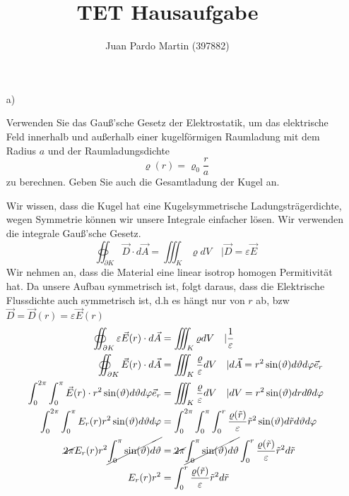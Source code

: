\documentclass{scrartcl}
\title{TET Hausaufgabe}
\author{Juan Pardo Martin (397882)}
\let\*\cdot
\begin{document}
\maketitle
\begin{itemize}
\item[a)] 
  
Verwenden Sie das Gauß’sche Gesetz der Elektrostatik, um das elektrische Feld innerhalb und außerhalb einer kugelförmigen Raumladung mit dem Radius $a$ und der Raumladungsdichte
\[\varrho(r)=\varrho_0 \frac{r}{a}\]
zu berechnen. Geben Sie auch die Gesamtladung der Kugel an.

Wir wissen, dass die Kugel hat eine Kugelsymmetrische Ladungsträgerdichte, wegen Symmetrie können wir unsere Integrale einfacher lösen.
Wir verwenden die integrale Gauß’sche Gesetz. 
\[\oiint_{\partial K} \vec{D} \* d \vec{A} = \iiint_{K} \varrho dV\quad | \vec{D}=\varepsilon \vec{E}\]
Wir nehmen an, dass die Material eine linear isotrop homogen Permitivität hat.
Da unsere Aufbau symmetrisch ist, folgt daraus, dass die Elektrische Flussdichte auch symmetrisch ist, d.h es hängt nur von $r$ ab, bzw $\vec{D}=\vec{D}(r)=\varepsilon \vec{E}(r)$
      \begin{align}
        \oiint_{\partial K} \varepsilon\vec{E}(r) \* d \vec{A} &= \iiint_{K} \varrho dV \quad| \frac{1}{\varepsilon} \nonumber\\
        \oiint_{\partial K} \vec{E}(r) \* d \vec{A} &= \iiint_{K} \frac{\varrho}{\varepsilon} dV \quad| d \vec{A} = r^2 \sin(\vartheta) d\vartheta d\varphi \vec{e}_r \nonumber\\
\int_0^{2\pi} \int_0^\pi \vec{E}(r) \* r^2 \sin(\vartheta) d\vartheta d\varphi \vec{e}_r &= \iiint_{K} \frac{\varrho}{\varepsilon} dV \quad| dV= r^2\sin(\vartheta)dr d\theta d\varphi \nonumber\\
\int_0^{2\pi} \int_0^\pi E_r(r)  r^2 \sin(\vartheta) d\vartheta d\varphi  &=\int_0^{2\pi} \int_0^\pi \int_0^r \frac{\varrho(\tilde{r})}{\varepsilon} \tilde{r}^2\sin(\vartheta)d\tilde{r} d\vartheta d\varphi \label{eq:1}\\
\cancel{2\pi} E_r(r)  r^2 \cancel{\int_0^\pi \sin(\vartheta) d\vartheta}  &=\cancel{2\pi} \cancel{\int_0^\pi \sin(\vartheta) d\vartheta} \int_0^r \frac{\varrho(\tilde{r})}{\varepsilon} \tilde{r}^2d\tilde{r} \nonumber\\
 E_r(r)  r^2   &=\int_0^r \frac{\varrho(\tilde{r})}{\varepsilon} \tilde{r}^2d\tilde{r} \nonumber
    \end{align}


\end{itemize}
\end{document}
